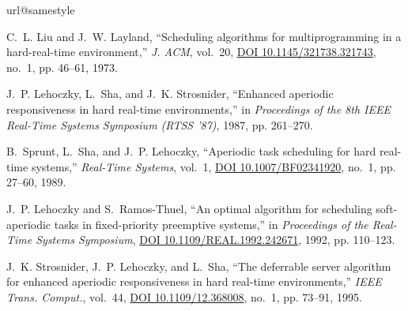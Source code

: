 \documentclass[journal]{IEEEtranTIE}
\begin{document}
\begin{thebibliography}{10}
\providecommand{\url}[1]{#1}
\csname url@samestyle\endcsname
\providecommand{\newblock}{\relax}
\providecommand{\bibinfo}[2]{#2}
\providecommand{\BIBentrySTDinterwordspacing}{\spaceskip=0pt\relax}
\providecommand{\BIBentryALTinterwordstretchfactor}{4}
\providecommand{\BIBentryALTinterwordspacing}{\spaceskip=\fontdimen2\font plus
\BIBentryALTinterwordstretchfactor\fontdimen3\font minus
  \fontdimen4\font\relax}
\providecommand{\BIBforeignlanguage}[2]{{%
\expandafter\ifx\csname l@#1\endcsname\relax
\typeout{** WARNING: IEEEtran.bst: No hyphenation pattern has been}%
\typeout{** loaded for the language `#1'. Using the pattern for}%
\typeout{** the default language instead.}%
\else
\language=\csname l@#1\endcsname
\fi
#2}}
\providecommand{\BIBdecl}{\relax}
\BIBdecl

C.~L. Liu and J.~W. Layland, ``Scheduling algorithms for multiprogramming in a
  hard-real-time environment,'' \emph{J. {ACM}}, vol.~20,
  \href{http://dx.doi.org/10.1145/321738.321743}{DOI 10.1145/321738.321743},
  no.~1, pp. 46--61, 1973.

J.~P. Lehoczky, L.~Sha, and J.~K. Strosnider, ``Enhanced aperiodic
  responsiveness in hard real-time environments,'' in \emph{Proceedings of the
  8th {IEEE} Real-Time Systems Symposium {(RTSS} '87)}, 1987, pp. 261--270.

B.~Sprunt, L.~Sha, and J.~P. Lehoczky, ``Aperiodic task scheduling for hard
  real-time systems,'' \emph{Real-Time Systems}, vol.~1,
  \href{http://dx.doi.org/10.1007/BF02341920}{DOI 10.1007/BF02341920}, no.~1,
  pp. 27--60, 1989.

J.~P. Lehoczky and S.~Ramos{-}Thuel, ``An optimal algorithm for scheduling
  soft-aperiodic tasks in fixed-priority preemptive systems,'' in
  \emph{Proceedings of the Real-Time Systems Symposium},
  \href{http://dx.doi.org/10.1109/REAL.1992.242671}{DOI
  10.1109/REAL.1992.242671}, 1992, pp. 110--123.

J.~K. Strosnider, J.~P. Lehoczky, and L.~Sha, ``The deferrable server algorithm
  for enhanced aperiodic responsiveness in hard real-time environments,''
  \emph{{IEEE} Trans. Comput.}, vol.~44,
  \href{http://dx.doi.org/10.1109/12.368008}{DOI 10.1109/12.368008}, no.~1, pp.
  73--91, 1995.


\end{thebibliography}
\end{document}
